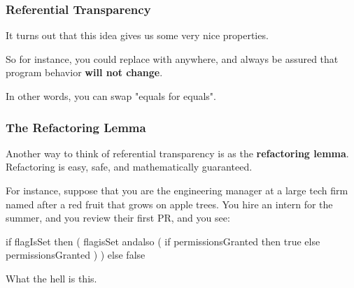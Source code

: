 \documentclass[aspectratio=169, handout]{beamer}
\begin{document}
\begin{frame}[fragile]
  \frametitle{Referential Transparency}

  \ptmt

  It turns out that this idea gives us some very nice properties.

  \pause
  \vspace{\fill}


  \pause
  \vspace{\fill}

  So for instance, you could replace  with  anywhere, and always
  be assured that program behavior \textbf{will not change}.

  \pause
  \vspace{5pt}

  In other words, you can swap "equals for equals".

  \pause
  \vspace{\fill}

\end{frame}

\begin{frame}[fragile]
  \frametitle{The Refactoring Lemma}

  Another way to think of referential transparency is as the
  \textbf{refactoring lemma}. Refactoring is easy, safe, and
  mathematically guaranteed.

  \pause
  \vspace{\fill}

  For instance, suppose that you are the engineering manager at a large
  tech firm named after a red fruit that grows on apple trees. You
  hire an intern for the summer, and you review their first PR, and you
  see:

  \pause
  \begin{codeblock}
    if flagIsSet then (
      flagisSet andalso (
        if permissionsGranted then
          true
        else
          permissionsGranted
      )
    ) else false
  \end{codeblock}

  \pause
  \vspace{\fill}

  What the hell is this.
\end{frame}
\end{document}
